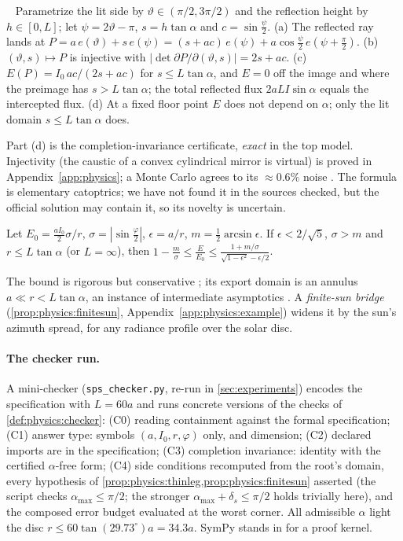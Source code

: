 \begin{proposition}\ \label{prop:physics:legexact}
Parametrize the lit side by $\vartheta\in(\pi/2,3\pi/2)$ and the reflection height by
$h\in[0,L]$; let $\psi=2\vartheta-\pi$, $s=h\tan\alpha$ and $c=\sin\frac\psi2$. (a) The
reflected ray lands at
$P=a\,e(\vartheta)+s\,e(\psi)=(s+ac)\,e(\psi)+a\cos\frac\psi2\,e(\psi+\frac\pi2)$. (b)
$(\vartheta,s)\mapsto P$ is injective with $|\det\partial P/\partial(\vartheta,s)|=2s+ac$. (c)
$E(P)=I_0\,ac/(2s+ac)$ for $s\le L\tan\alpha$, and $E=0$ off the image and where the preimage
has $s>L\tan\alpha$; the total reflected flux $2aLI\sin\alpha$ equals the intercepted flux.
(d) At a fixed floor point $E$ does not depend on $\alpha$; only the lit domain
$s\le L\tan\alpha$ does.
\end{proposition}

Part (d) is the completion-invariance certificate, \emph{exact} in the top model.
Injectivity (the caustic of a convex cylindrical mirror is virtual) is proved in
Appendix~\ref{app:physics}; a Monte Carlo agrees to its ${\approx}0.6\%$ noise
. The formula is elementary catoptrics; we have not found it in the
sources checked, but the official solution may contain it, so its novelty is uncertain.

\begin{proposition}\label{prop:physics:thinleg}
Let $E_0=\frac{aI_0}{2}\sigma/r$, $\sigma=|\sin\frac\varphi2|$, $\epsilon=a/r$,
$m=\frac12\arcsin\epsilon$. If $\epsilon<2/\sqrt5$, $\sigma>m$ and $r\le L\tan\alpha$ (or
$L=\infty$), then
$1-\frac m\sigma\le\frac{E}{E_0}\le\frac{1+m/\sigma}{\sqrt{1-\epsilon^2}-\epsilon/2}$.
\end{proposition}

The bound is rigorous but conservative ; its export domain is an annulus
$a\ll r<L\tan\alpha$, an instance of intermediate asymptotics
\citep{barenblatt1996scaling}. A \emph{finite-sun bridge} (\cref{prop:physics:finitesun},
Appendix~\ref{app:physics:example}) widens it by the sun's azimuth spread, for any radiance
profile over the solar disc.

\paragraph{The checker run.} A mini-checker (\texttt{sps\_checker.py}, re-run in
\cref{sec:experiments}) encodes the specification with $L=60a$ and runs concrete versions
of the checks of \cref{def:physics:checker}: (C0) reading containment against the formal
specification; (C1) answer type: symbols $(a,I_0,r,\varphi)$ only, and dimension; (C2)
declared imports are in the specification; (C3) completion invariance: identity with the
certified $\alpha$-free form; (C4) side conditions recomputed from the root's domain, every hypothesis of
\cref{prop:physics:thinleg,prop:physics:finitesun} asserted (the script checks
$\alpha_{\max}\le\pi/2$; the stronger $\alpha_{\max}+\delta_s\le\pi/2$ holds trivially here),
and the composed error budget evaluated at the worst corner. All admissible $\alpha$ light
the disc $r\le60\tan(29.73^\circ)a=34.3a$. SymPy stands in for a proof kernel.

